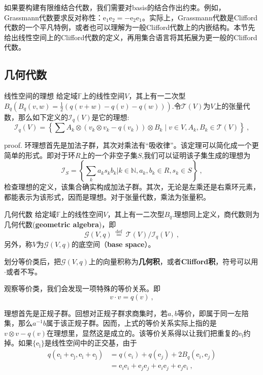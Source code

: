 

如果要构建有限维结合代数，我们需要对basis的结合作出约束。例如，Grassmann代数要求反对称性：$\mathrm {e_1e_2}=-\mathrm {e_2e_1}$。实际上，Grassmann代数是Clifford代数的一个平凡特例，或者也可以理解为一般Clifford代数上的内嵌结构。本节先给出线性空间上的Clifford代数的定义，再用集合语言将其拓展为更一般的Clifford代数。
\subsection{几何代数}
\begin{theorem}{线性空间的理想}
给定域$\mathbb F$上的线性空间$V$，其上有一二次型$B_q(B_q(v,w)=\frac{1}{2}(q(v+w)-q(v)-q(w)))$.令$\mathcal T(V)$为$V$上的张量代数，那么如下定义的$\mathcal {I}_q(V)$是它的理想:
\begin{equation}
\mathcal{I}_{q}(V)=\left\{\sum A_{k} \otimes(v_k \otimes v_k-q(v_k)) \otimes B_{k} \mid v \in V, A_{k}, B_{k} \in \mathcal{T}(V)\right\}~,
\end{equation}
\end{theorem}
proof.
环理想首先是加法子群，其次对乘法有“吸收律”。该定理可以简化成一个更简单的形式。即对于环$R$上的一个非空子集$S$,我们可以证明该子集生成的理想为
\begin{equation}
\mathcal {I}_S=\left\{\sum _k a_k s_kb_k|k\in \mathbb N ,a_k,b_k\in R,s_k\in S\right\}~,
\end{equation}
检查理想的定义，该集合确实构成加法子群。其次，无论是左乘还是右乘环元素，都能表示为该形式，因而是理想。对于张量代数，乘法为张量积。

\begin{definition}{几何代数}
给定域$\mathbb F$上的线性空间$V$，其上有一二次型$B_q$.理想同上定义，商代数则为几何代数(\textbf{geometric algebra})，即
\begin{equation}
\mathcal{G}(V, q) \stackrel{\text { def }}{=} \mathcal{T}(V) / \mathcal{I}_{q}(V)~,
\end{equation}
另外，称$V$为$\mathcal{G}(V, q)$的底空间（\textbf{base space}）。
\end{definition}
划分等价类后，把$\mathcal{G}(V, q)$上的向量积称为\textbf{几何积}，或者\textbf{Clifford积}，符号可以用$\cdot$或者不写。

观察等价类，我们会发现一项特殊的等价关系。即
\begin{equation}
v\cdot v=q(v)~,
\end{equation}

理想首先是正规子群。回想对正规子群求商集时，若$a,b$等价，即属于同一左陪集，那么$a^{-1}b$属于该正规子群。因而，上式的等价关系实际上指的是
$v \otimes v-q(v)$在理想里，显然这是成立的。该等价关系得以让我们把重复的$\mathrm {e_i}$约掉。如果$\{\mathrm{e_i}\}$是线性空间中的正交基，由于
\begin{equation}
\begin{aligned}
q(\mathrm{e_i+e_j,e_i+e_j})&=q(\mathrm{e}_i)+q(\mathrm{e}_j)+2 B_q(\mathrm{e}_i,\mathrm{e}_j)\\
&=\mathrm{e}_i\mathrm{e}_i+\mathrm{e}_j\mathrm{e}_j+\mathrm{e}_i\mathrm{e}_j+\mathrm{e}_j\mathrm{e}_i~,
\end{aligned}
\end{equation}

